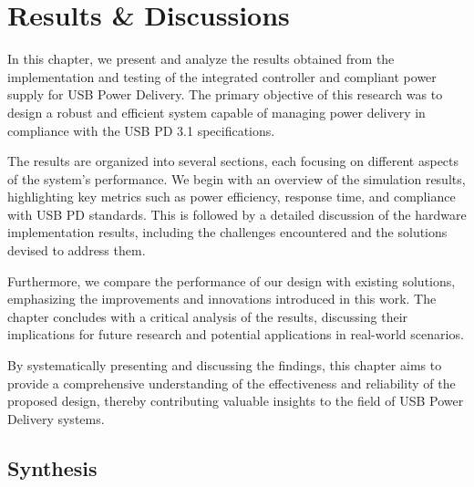 \chapter{Results \& Discussions}

In this chapter, we present and analyze the results obtained from the implementation and testing of the integrated controller and compliant power supply for USB Power Delivery. The primary objective of this research was to design a robust and efficient system capable of managing power delivery in compliance with the USB PD 3.1 specifications.

The results are organized into several sections, each focusing on different aspects of the system’s performance. We begin with an overview of the simulation results, highlighting key metrics such as power efficiency, response time, and compliance with USB PD standards. This is followed by a detailed discussion of the hardware implementation results, including the challenges encountered and the solutions devised to address them.

Furthermore, we compare the performance of our design with existing solutions, emphasizing the improvements and innovations introduced in this work. The chapter concludes with a critical analysis of the results, discussing their implications for future research and potential applications in real-world scenarios.

By systematically presenting and discussing the findings, this chapter aims to provide a comprehensive understanding of the effectiveness and reliability of the proposed design, thereby contributing valuable insights to the field of USB Power Delivery systems.

\section{Synthesis}

